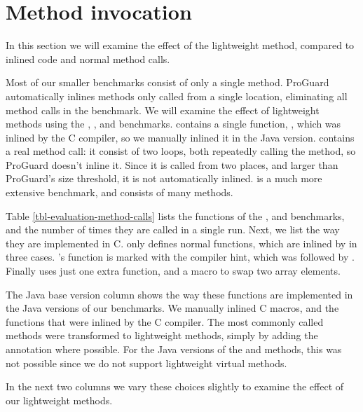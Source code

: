 \section{Method invocation}
\label{sec-evaluation-method-invocation}


In this section we will examine the effect of the lightweight method, compared to inlined code and normal method calls.

Most of our smaller benchmarks consist of only a single method. ProGuard automatically inlines methods only called from a single location, eliminating all method calls in the  benchmark. We will examine the effect of lightweight methods using the , , and  benchmarks.
 contains a single function, , which was inlined by the C compiler, so we manually inlined it in the Java version.  contains a real method call: it consist of two loops, both repeatedly calling the  method, so ProGuard doesn't inline it. Since it is called from two places, and larger than ProGuard's size threshold, it is not automatically inlined. is a much more extensive benchmark, and consists of many methods.

Table \ref{tbl-evaluation-method-calls} lists the functions of the ,  and  benchmarks, and the number of times they are called in a single run. Next, we list the way they are implemented in C.  only defines normal functions, which are inlined by  in three cases. 's  function is marked with the  compiler hint, which was followed by . Finally  uses just one extra function, and a macro to swap two array elements.

The Java base version column shows the way these functions are implemented in the Java versions of our benchmarks. We manually inlined C macros, and the functions that were inlined by the C compiler. The most commonly called methods were transformed to lightweight methods, simply by adding the  annotation where possible. For the Java versions of the  and  methods, this was not possible since we do not support lightweight virtual methods.

In the next two columns we vary these choices slightly to examine the effect of our lightweight methods.

